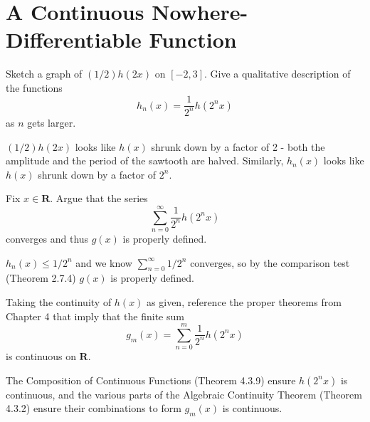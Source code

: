\section{A Continuous Nowhere-Differentiable Function}

\begin{exercise}
    Sketch a graph of \((1/2)h(2x)\) on \([-2,3]\). Give a qualitative description of the functions
    \[h_n(x) = \frac{1}{2^n}h(2^n x)\] as \(n\) gets larger.
\end{exercise}

\begin{solution}
\((1/2)h(2x)\) looks like \(h(x)\) shrunk down by a factor of 2 - both the amplitude and the period of the sawtooth are halved. Similarly, \(h_n(x)\) looks like \(h(x)\) shrunk down by a factor of \(2^n\).
\end{solution}

\begin{exercise}
 Fix $x \in \mathbf{R}$. Argue that the series
\[
\sum_{n=0}^{\infty} \frac{1}{2^{n}} h\left(2^{n} x\right)
\]
converges and thus $g(x)$ is properly defined.
\end{exercise}

\begin{solution}
\(h_n(x) \leq 1/2^n\) and we know \(\sum^\infty_{n=0} 1/2^n\) converges, so by the comparison test (Theorem 2.7.4) \(g(x)\) is properly defined.
\end{solution}

\begin{exercise}
Taking the continuity of $h(x)$ as given, reference the proper theorems from Chapter 4 that imply that the finite sum
\[
g_{m}(x)=\sum_{n=0}^{m} \frac{1}{2^{n}} h\left(2^{n} x\right)
\]
is continuous on $\mathbf{R}$.
\end{exercise}
\begin{solution}
The Composition of Continuous Functions (Theorem 4.3.9) ensure \(h(2^n x)\) is continuous, and the various parts of the Algebraic Continuity Theorem (Theorem 4.3.2) ensure their combinations to form \(g_m(x)\) is continuous.
\end{solution}

